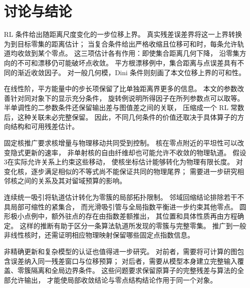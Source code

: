 \section{讨论与结论}
\label{sec:conclusion}

RL 条件给出随距离尺度变化的一步位移上界。
真实残差误差界将这一上界转换为到目标零集的距离估计；
当复合条件给出严格收缩且位移可和时，每条允许轨道均收敛到某个零点。
这三项估计各有作用：即使集合距离几何下降，
沿零集方向的不可和漂移仍可能破坏点收敛。
平方根漂移例中，集合距离与点误差具有不同的渐近收敛因子。
对一般几何模，Dini 条件则刻画了本文位移上界的可和性。

在线性阶，平方能量中的步长项保留了比单独距离界更多的信息。
本文的参数改善针对同对象下的显示充分条件，
旋转例说明所得因子在所列参数点可以取等。
半单调性的二参数条件还保留输出差与图值差之间的关联，
压缩成一个 RL 常数后，这种关联未必完整保留。
因此，不同几何条件的价值还取决于具体算子的方向结构和可用残差估计。

固定核推广要求核增量与物理移动共同受到控制。
核在零点附近的平坦性可以改变隐式更新的速率，
非单射核的自由纤维却也可能允许不收敛的物理轨道。
假设3在实际允许关系上约束这些移动，
使核坐标估计能够转化为物理有限长度。
对变化核，逐步满足相似的不等式尚不能保证共同的物理尾界；
需要进一步研究相邻核之间的关系及其对留域预算的影响。

连续统一吸引将轨道估计转化为零簇的局部拓扑限制。
邻域回缩结论排除若干不具局部可缩性的紧集合，
而光滑吸引管与全局指数平衡进一步约束其他零点。
圆形极小点例中，额外驻点的存在由指数差额推出，
其位置和具体性质再由方程确定。
这样的推断有助于区分一条算法轨道所发现的零簇与完整零集。
推广到一般非线性核时，还需证明相应物理映射保留哪些固定点指数信息。

非精确更新和复杂模型的认证也值得进一步研究。
对前者，需要将可计算的图包含误差纳入同一残差窗口与位移预算；
对后者，需要从模型本身建立完整输入覆盖、零簇隔离和全局边界条件。
这些问题要求保留原算子的完整残差与算法的全部允许输出，
才能使局部收敛结论与零点结构结论作用于同一个对象。
